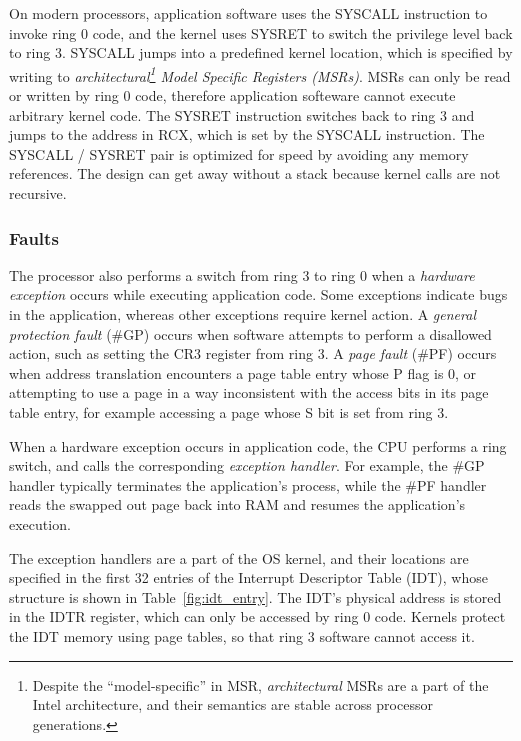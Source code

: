 On modern processors, application software uses the SYSCALL instruction to
invoke ring 0 code, and the kernel uses SYSRET to switch the privilege level
back to ring 3. SYSCALL jumps into a predefined kernel location, which is
specified by writing to \textit{architectural\footnote{Despite the
``model-specific'' in MSR, \textit{architectural} MSRs are a part of the Intel
architecture, and their semantics are stable across processor generations.}
Model Specific Registers (MSRs)}. MSRs can only be read or written by ring 0
code, therefore application softeware cannot execute arbitrary kernel code.
The SYSRET instruction switches back to ring 3 and jumps to the address in RCX,
which is set by the SYSCALL instruction. The SYSCALL / SYSRET pair is optimized
for speed by avoiding any memory references. The design can get away without a
stack because kernel calls are not recursive.


\subsubsection{Faults}
\label{sec:faults}


The processor also performs a switch from ring 3 to ring 0 when a \textit{
hardware exception} occurs while executing application code. Some exceptions
indicate bugs in the application, whereas other exceptions require kernel
action. A \textit{general protection fault} (\#GP) occurs when software
attempts to perform a disallowed action, such as setting the CR3 register from
ring 3. A \textit{page fault} (\#PF) occurs when address translation encounters
a page table entry whose P flag is 0, or attempting to use a page in a way
inconsistent with the access bits in its page table entry, for example
accessing a page whose S bit is set from ring 3.


When a hardware exception occurs in application code, the CPU performs a ring
switch, and calls the corresponding \textit{exception handler}. For example,
the \#GP handler typically terminates the application's process, while the \#PF
handler reads the swapped out page back into RAM and resumes the application's
execution.

The exception handlers are a part of the OS kernel, and their locations are
specified in the first 32 entries of the Interrupt Descriptor Table (IDT),
whose structure is shown in Table~\ref{fig:idt_entry}. The IDT's physical
address is stored in the IDTR register, which can only be accessed by ring 0
code. Kernels protect the IDT memory using page tables, so that ring 3 software
cannot access it.

